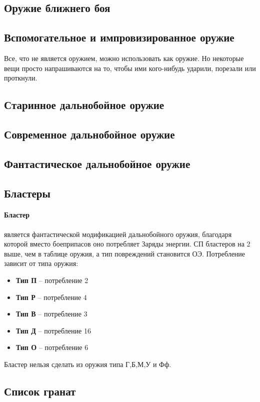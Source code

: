 \subsection{Оружие ближнего боя}

\subsection{Вспомогательное и импровизированное оружие}
Все, что не является оружием, можно использовать как оружие. Но некоторые вещи просто напрашиваются на то, чтобы ими кого-нибудь ударили, порезали или проткнули.

\subsection{Старинное дальнобойное оружие}

\subsection{Современное дальнобойное оружие}

\subsection{Фантастическое дальнобойное оружие}

\subsection{Бластеры}
\paragraph{Бластер} является фантастической модификацией дальнобойного оружия, благодаря которой вместо боеприпасов оно потребляет Заряды энергии. СП бластеров на 2 выше, чем в таблице оружия, а тип повреждений становится ОЭ. Потребление зависит от типа оружия:
\begin{itemize}
\item \textbf{Тип П} -- потребление 2
\item \textbf{Тип Р} -- потребление 4
\item \textbf{Тип В} -- потребление 3
\item \textbf{Тип Д} -- потребление 16
\item \textbf{Тип О} -- потребление 6
\end{itemize}
Бластер нельзя сделать из оружия типа Г,Б,М,У и Фф.


\subsection{Список гранат}
